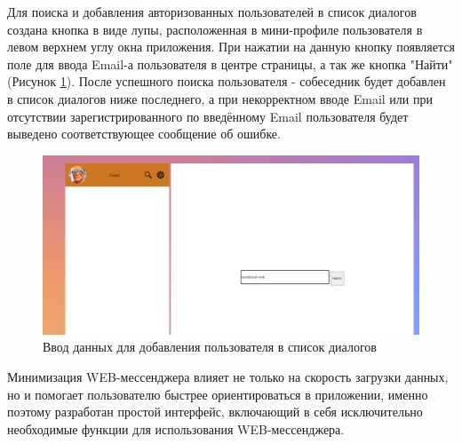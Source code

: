 \documentclass[14pt,final]{report}
\begin{document}
Для поиска и добавления авторизованных пользователей в список диалогов создана кнопка в виде лупы, расположенная в мини-профиле пользователя в левом верхнем углу окна приложения. При нажатии на данную кнопку появляется поле для ввода Email-а пользователя в центре страницы, а так же кнопка "Найти"(Рисунок \ref{fig:my_label6}). После успешного поиска пользователя - собеседник будет добавлен в список диалогов ниже последнего, а при некорректном вводе Email или при отсутствии зарегистрированного по введённому Email пользователя будет выведено соответствующее сообщение об ошибке.
\begin{figure}[H]
    \centering
    \includegraphics[width=13cm]{poisk.png}
    \caption{Ввод данных для добавления пользователя в список диалогов}
    \label{fig:my_label6}
\end{figure}
\par
Минимизация WEB-мессенджера влияет не только на скорость загрузки данных, но и помогает пользователю быстрее ориентироваться в приложении, именно поэтому разработан простой интерфейс, включающий в себя исключительно необходимые функции для использования WEB-мессенджера. 
\end{document}
